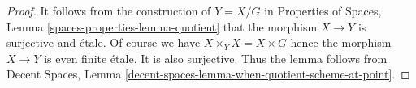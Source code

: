 \documentclass{stacks-project}
\theoremstyle{plain}
\theoremstyle{definition}
\theoremstyle{remark}
\numberwithin{equation}{subsection}
\begin{document}
\begin{proof}
It follows from the construction of $Y = X/G$ in
Properties of Spaces, Lemma \ref{spaces-properties-lemma-quotient}
that the morphism $X \to Y$ is surjective and \'etale.
Of course we have $X \times_Y X = X \times G$ hence the morphism
$X \to Y$ is even finite \'etale. It is also surjective.
Thus the lemma follows from
Decent Spaces, Lemma \ref{decent-spaces-lemma-when-quotient-scheme-at-point}.
\end{proof}
\end{document}
